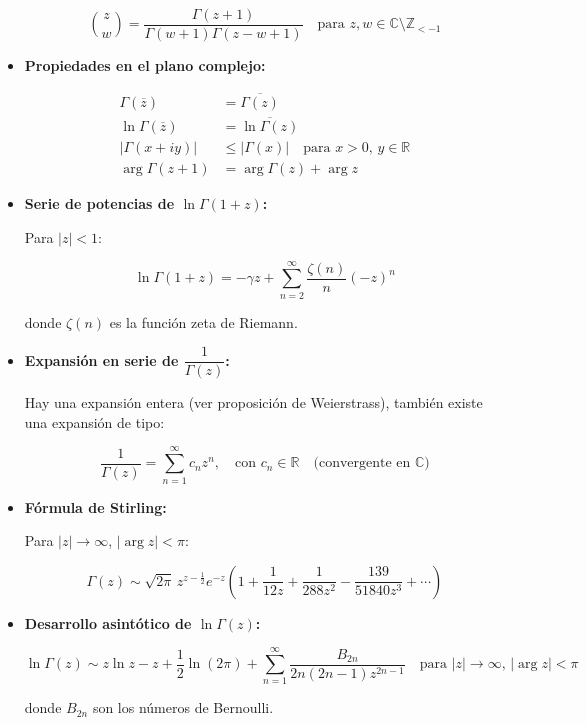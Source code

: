 \begin{itemize}
	      \[
		      \binom{z}{w} = \frac{\Gamma(z+1)}{\Gamma(w+1)\Gamma(z-w+1)}
		      \quad \text{para } z, w \in \mathbb{C} \setminus \mathbb{Z}_{< -1}
	      \]

	\item \textbf{Propiedades en el plano complejo:}

	      \begin{align*}
		      \Gamma(\overline{z})     & = \overline{\Gamma(z)}                                        \\
		      \ln \Gamma(\overline{z}) & = \overline{\ln \Gamma(z)}                                    \\
		      |\Gamma(x + i y)|        & \leq |\Gamma(x)| \quad \text{para } x > 0,\, y \in \mathbb{R} \\
		      \arg \Gamma(z+1)         & = \arg \Gamma(z) + \arg z
	      \end{align*}

	\item \textbf{Serie de potencias de \( \ln \Gamma(1+z) \):}

	      Para \( |z| < 1 \):

	      \[
		      \ln \Gamma(1 + z) = -\gamma z + \sum_{n=2}^\infty \frac{\zeta(n)}{n} (-z)^n
	      \]

	      donde \( \zeta(n) \) es la función zeta de Riemann.

	\item \textbf{Expansión en serie de \( \dfrac{1}{\Gamma(z)} \):}

	      Hay una expansión entera (ver proposición de Weierstrass),  también existe una expansión de tipo:

	      \[
		      \frac{1}{\Gamma(z)} = \sum_{n=1}^\infty c_n z^n, \quad \text{con } c_n \in \mathbb{R}
		      \quad \text{(convergente en } \mathbb{C})
	      \]

	\item \textbf{Fórmula de Stirling:}

	      Para \( |z| \to \infty \), \( |\arg z| < \pi \):

	      \[
		      \Gamma(z) \sim \sqrt{2\pi} \, z^{z - \frac{1}{2}} e^{-z} \left( 1 + \frac{1}{12z} + \frac{1}{288z^2} - \frac{139}{51840z^3} + \cdots \right)
	      \]
	\item \textbf{Desarrollo asintótico de \( \ln \Gamma(z) \):}

	      \[
		      \ln \Gamma(z) \sim z \ln z - z + \frac{1}{2} \ln(2\pi) + \sum_{n=1}^\infty \frac{B_{2n}}{2n(2n-1) z^{2n-1}}
		      \quad \text{para } |z| \to \infty,\, |\arg z| < \pi
	      \]

	      donde \( B_{2n} \) son los números de Bernoulli.



\end{itemize}

